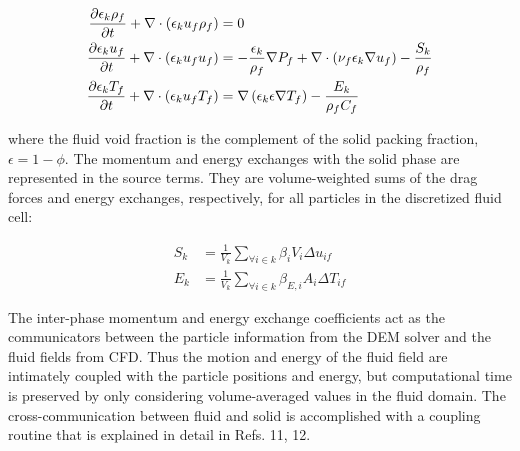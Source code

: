 \begin{subequations}
\begin{align}
\pder[\epsilon_k \rho_f]{t} + \nabla\cdot(\epsilon_k u_f \rho_f) &= 0\\
\pder[\epsilon_k u_f]{t} + \nabla\cdot(\epsilon_k u_f u_f) &= -\frac{\epsilon_k}{\rho_f}\nabla P_f + \nabla\cdot\left(\nu_f\epsilon_k\nabla u_f\right) - \frac{S_k}{\rho_f}\\
\pder[\epsilon_k T_f]{t} + \nabla\cdot(\epsilon_k u_f T_f) &= \nabla\left(\epsilon_k\epsilon\nabla T_f\right)-\frac{E_k}{\rho_fC_f}
\end{align}
\end{subequations}

where the fluid void fraction is the complement of the solid packing fraction, $\epsilon = 1 - \phi$. The momentum and energy exchanges with the solid phase are represented in the source terms. They are volume-weighted sums of the drag forces and energy exchanges, respectively, for all particles in the discretized fluid cell:

\begin{subequations}
\begin{align}
S_k &= \frac{1}{V_k}\sum_{\forall i \in k} \beta_i V_i \Delta u_{if}\\
E_k &= \frac{1}{V_k}\sum_{\forall i \in k} \beta_{E,i} A_i \Delta T_{if}
\end{align}
\end{subequations}

The inter-phase momentum and energy exchange coefficients act as the communicators between the particle information from the DEM solver and the fluid fields from CFD. Thus the motion and energy of the fluid field are intimately coupled with the particle positions and energy, but computational time is preserved by only considering volume-averaged values in the fluid domain. The cross-communication between fluid and solid is accomplished with a coupling routine that is explained in detail in Refs. 11, 12.







